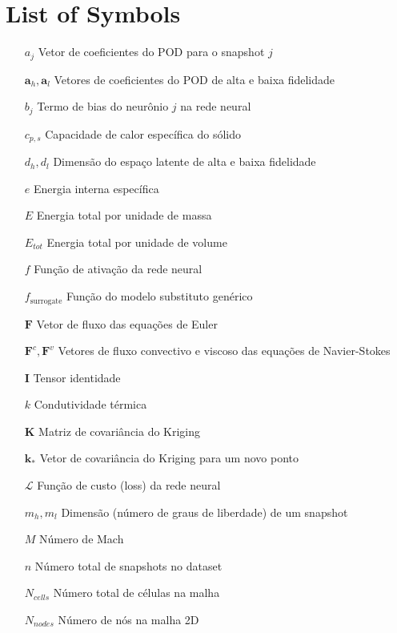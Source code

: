 
\chapter*{List of Symbols}

\begin{itemize}
\item[$a_j$] Vetor de coeficientes do POD para o snapshot $j$
\item[$\mathbf{a}_h, \mathbf{a}_l$] Vetores de coeficientes do POD de alta e baixa fidelidade
\item[$b_j$] Termo de bias do neurônio $j$ na rede neural
\item[$c_{p,s}$] Capacidade de calor específica do sólido
\item[$d_h, d_l$] Dimensão do espaço latente de alta e baixa fidelidade
\item[$e$] Energia interna específica
\item[$E$] Energia total por unidade de massa
\item[$E_{tot}$] Energia total por unidade de volume
\item[$f$] Função de ativação da rede neural
\item[$f_{\text{surrogate}}$] Função do modelo substituto genérico
\item[$\mathbf{F}$] Vetor de fluxo das equações de Euler
\item[$\mathbf{F}^c, \mathbf{F}^v$] Vetores de fluxo convectivo e viscoso das equações de Navier-Stokes
\item[$\mathbf{I}$] Tensor identidade
\item[$k$] Condutividade térmica
\item[$\mathbf{K}$] Matriz de covariância do Kriging
\item[$\mathbf{k}_*$] Vetor de covariância do Kriging para um novo ponto
\item[$\mathcal{L}$] Função de custo (loss) da rede neural
\item[$m_h, m_l$] Dimensão (número de graus de liberdade) de um snapshot
\item[$M$] Número de Mach
\item[$n$] Número total de snapshots no dataset
\item[$N_{cells}$] Número total de células na malha
\item[$N_{nodes}$] Número de nós na malha 2D

\end{itemize}
